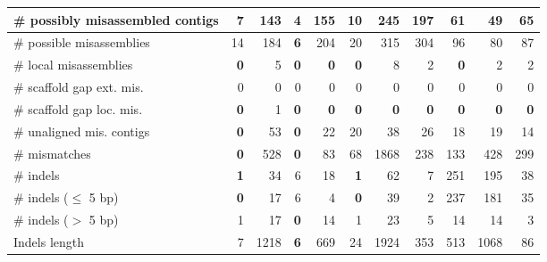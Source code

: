 \documentclass[12pt,a4paper]{article}
\begin{document}
\begin{table}[ht]
\begin{center}
\begin{tabular}{|l*{10}{|r}|}
\# possibly misassembled contigs & 7 & 143 & {\bf 4} & 155 & 10 & 245 & 197 & 61 & 49 & 65 \\ \hline
\hspace{5mm}\# possible misassemblies & 14 & 184 & {\bf 6} & 204 & 20 & 315 & 304 & 96 & 80 & 87 \\ \hline
\# local misassemblies & {\bf 0} & 5 & {\bf 0} & {\bf 0} & {\bf 0} & 8 & 2 & {\bf 0} & 2 & 2 \\ \hline
\# scaffold gap ext. mis. & 0 & 0 & 0 & 0 & 0 & 0 & 0 & 0 & 0 & 0 \\ \hline
\# scaffold gap loc. mis. & {\bf 0} & 1 & {\bf 0} & {\bf 0} & {\bf 0} & {\bf 0} & {\bf 0} & {\bf 0} & {\bf 0} & {\bf 0} \\ \hline
\# unaligned mis. contigs & {\bf 0} & 53 & {\bf 0} & 22 & 20 & 38 & 26 & 18 & 19 & 14 \\ \hline
\# mismatches & {\bf 0} & 528 & {\bf 0} & 83 & 68 & 1868 & 238 & 133 & 428 & 299 \\ \hline
\# indels & {\bf 1} & 34 & 6 & 18 & {\bf 1} & 62 & 7 & 251 & 195 & 38 \\ \hline
\hspace{5mm}\# indels ($\leq$ 5 bp) & {\bf 0} & 17 & 6 & 4 & {\bf 0} & 39 & 2 & 237 & 181 & 35 \\ \hline
\hspace{5mm}\# indels ($>$ 5 bp) & 1 & 17 & {\bf 0} & 14 & 1 & 23 & 5 & 14 & 14 & 3 \\ \hline
Indels length & 7 & 1218 & {\bf 6} & 669 & 24 & 1924 & 353 & 513 & 1068 & 86 \\ \hline
\end{tabular}
\end{center}
\end{table}
\end{document}
